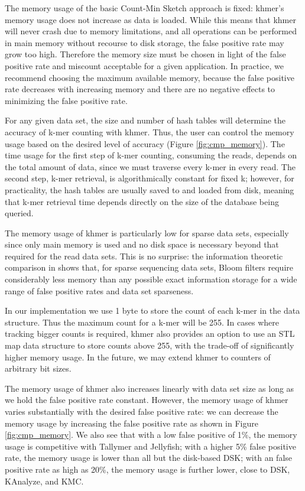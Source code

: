 The memory usage of the basic Count-Min Sketch approach is fixed:
khmer's memory usage does not increase as data is loaded. While this
means that khmer will never crash due to memory limitations, and all
operations can be performed in main memory without recourse to disk
storage, the false positive rate may grow too high.  Therefore the
memory size must be chosen in light of the false positive rate and
miscount acceptable for a given application.  In practice, we
recommend choosing the maximum available memory, because the false
positive rate decreases with increasing memory and there are no
negative effects to minimizing the false positive rate.

For any given data set, the size and number of hash tables will
determine the accuracy of k-mer counting with khmer.  Thus, the user
can control the memory usage based on the desired level of accuracy
(Figure \ref{fig:cmp_memory}). The time usage for the first step of
k-mer counting, consuming the reads, depends on the total amount of
data, since we must traverse every k-mer in every read.  The second
step, k-mer retrieval, is algorithmically constant for fixed k;
however, for practicality, the hash tables are usually saved to and
loaded from disk, meaning that k-mer retrieval time depends directly
on the size of the database being queried.

The memory usage of khmer is particularly low for sparse data sets,
especially since only main memory is used and no disk space is
necessary beyond that required for the read data sets.  This is no
surprise: the information theoretic comparison in \cite{Pell2012}
shows that, for sparse sequencing data sets, Bloom filters require
considerably less memory than any possible exact information storage
for a wide range of false positive rates and data set sparseness.

In our implementation we use 1 byte to store the count of each k-mer
in the data structure. Thus the maximum count for a k-mer will be 255.
In cases where tracking bigger counts is required, khmer also provides
an option to use an STL map data structure to store counts above 255,
with the trade-off of significantly higher memory usage.  In the
future, we may extend khmer to counters of arbitrary bit sizes.



The memory usage of khmer also increases linearly with data set size
as long as we hold the false positive rate constant.  However, the
memory usage of khmer varies substantially with the desired false
positive rate: we can decrease the memory usage by increasing the
false positive rate as shown in Figure \ref{fig:cmp_memory}.  We also
see that with a low false positive of 1\%, the memory usage is
competitive with Tallymer and Jellyfish; with a higher 5\% false
positive rate, the memory usage is lower than all but the disk-based
DSK; with an false positive rate as high as 20\%, the memory usage is
further lower, close to DSK, KAnalyze, and KMC.


